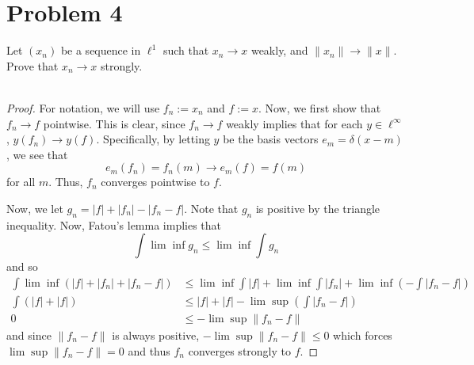 \documentclass[fontsize=11pt]{scrartcl} %
\numberwithin{equation}{section} %
\numberwithin{figure}{section} %
\numberwithin{table}{section} %
\begin{document}
\section*{Problem 4}
Let $(x_n)$ be a sequence in $\ell^1$ such that $x_n\to x$ weakly, and
$\|x_n\|\to\|x\|$. Prove that $x_n\to x$ strongly.
\\
\\
\begin{proof}
    For notation, we will use $f_n := x_n$ and $f:=x$. Now, we first show that
    $f_n\to f$ pointwise. This is clear, since $f_n\to f$ weakly implies that
    for each $y\in\ell^{\infty}$, $y(f_n)\to y(f)$. Specifically, by letting $y$
    be the basis vectors $e_m = \delta(x-m)$, we see that
    \[
        e_m(f_n) = f_n(m) \to e_m(f) = f(m)
    \]
    for all $m$. Thus, $f_n$ converges pointwise to $f$.

    Now, we let $g_n = |f|+|f_n| - |f_n-f|$. Note that $g_n$ is positive by the
    triangle inequality. Now, Fatou's lemma implies that
    \[
        \int\lim\inf g_n \leq \lim\inf\int g_n
    \]
    and so
    \[
\begin{aligned}
    \int\lim\inf(|f|+|f_n|+|f_n-f|) &\leq \lim\inf\int|f| + \lim\inf\int|f_n| +
    \lim\inf(-\int|f_n-f|)\\
    \int(|f|+|f|) &\leq |f| + |f| - \lim\sup(\int|f_n-f|)\\
    0&\leq-\lim\sup\|f_n-f\|
\end{aligned}
    \]
    and since $\|f_n-f\|$ is always positive, $-\lim\sup\|f_n-f\|\leq 0$ which
    forces $\lim\sup\|f_n-f\| = 0$ and thus $f_n$ converges strongly to $f$.
\end{proof}

\newpage
\end{document}
